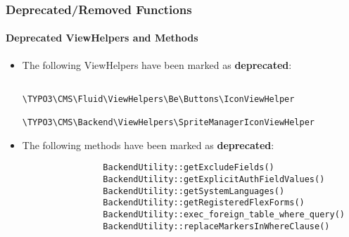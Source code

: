 \begin{frame}[fragile]
	\frametitle{Deprecated/Removed Functions}
	\framesubtitle{Deprecated ViewHelpers and Methods}


	\begin{itemize}

		\item The following ViewHelpers have been marked as \textbf{deprecated}:

			\begin{lstlisting}
				\TYPO3\CMS\Fluid\ViewHelpers\Be\Buttons\IconViewHelper
				\TYPO3\CMS\Backend\ViewHelpers\SpriteManagerIconViewHelper
			\end{lstlisting}

		\item The following methods have been marked as \textbf{deprecated}:

			\begin{lstlisting}
				BackendUtility::getExcludeFields()
				BackendUtility::getExplicitAuthFieldValues()
				BackendUtility::getSystemLanguages()
				BackendUtility::getRegisteredFlexForms()
				BackendUtility::exec_foreign_table_where_query()
				BackendUtility::replaceMarkersInWhereClause()
			\end{lstlisting}

	\end{itemize}

\end{frame}

